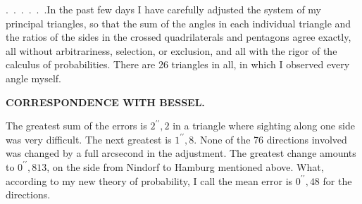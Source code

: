 \par\noindent\hspace*{\parindent}.\ .\ .\ .\ .\ .\quad In the past few days I have carefully adjusted the system of my principal triangles, so that the sum of the angles in each individual triangle and the ratios of the sides in the crossed quadrilaterals and pentagons agree exactly, all without arbitrariness, selection, or exclusion, and all with the rigor of the calculus of probabilities.
There are 26 triangles in all, in which I observed every angle myself.
\par\clearpage
{}\hfill{\small\textbf{CORRESPONDENCE WITH BESSEL.}}\par\medskip
\noindent The greatest sum of the errors is \(2^{\prime\prime}{,}2\) in a triangle where sighting along one side was very difficult. The next greatest is \(1^{\prime\prime}{,}8\).
None of the 76 directions involved was changed by a full arcsecond in the adjustment. The greatest change amounts to \(0^{\prime\prime}{,}813\), on the side from Nindorf to Hamburg mentioned above.
What, according to my new theory of probability, I call the mean error is \(0^{\prime\prime}{,}48\) for the directions.
\par\endgroup

